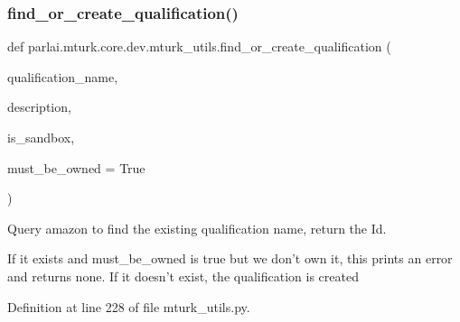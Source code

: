 \subsubsection{\texorpdfstring{find\+\_\+or\+\_\+create\+\_\+qualification()}{find\_or\_create\_qualification()}}
{\footnotesize\ttfamily def parlai.\+mturk.\+core.\+dev.\+mturk\+\_\+utils.\+find\+\_\+or\+\_\+create\+\_\+qualification (\begin{DoxyParamCaption}\item[{}]{qualification\+\_\+name,  }\item[{}]{description,  }\item[{}]{is\+\_\+sandbox,  }\item[{}]{must\+\_\+be\+\_\+owned = {\ttfamily True} }\end{DoxyParamCaption})}

\begin{DoxyVerb}Query amazon to find the existing qualification name, return the Id.

If it exists and must_be_owned is true but we don't own it, this prints an error and
returns none. If it doesn't exist, the qualification is created
\end{DoxyVerb}
 

Definition at line 228 of file mturk\+\_\+utils.\+py.


